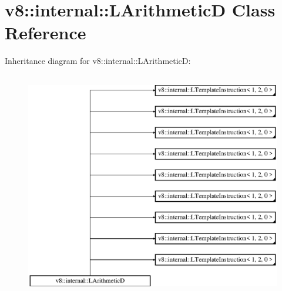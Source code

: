 \hypertarget{classv8_1_1internal_1_1_l_arithmetic_d}{}\section{v8\+:\+:internal\+:\+:L\+ArithmeticD Class Reference}
\label{classv8_1_1internal_1_1_l_arithmetic_d}
Inheritance diagram for v8\+:\+:internal\+:\+:L\+ArithmeticD\+:\begin{figure}[H]
\begin{center}
\leavevmode
\includegraphics[height=10.000000cm]{classv8_1_1internal_1_1_l_arithmetic_d}
\end{center}
\end{figure}
